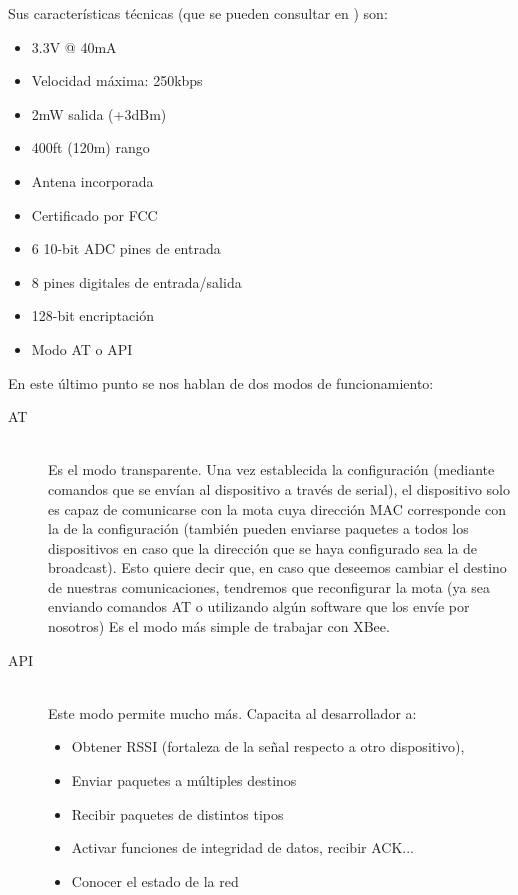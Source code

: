 Sus características técnicas (que se pueden consultar en \cite{xbeedatasheet}) son:
\begin{itemize}
  \item 3.3V @ 40mA
  \item Velocidad máxima: 250kbps
  \item 2mW salida (+3dBm)
  \item 400ft (120m) rango
  \item Antena incorporada
  \item Certificado por FCC
  \item 6 10-bit ADC pines de entrada
  \item 8 pines digitales de entrada/salida
  \item 128-bit encriptación
  \item Modo AT o API
\end{itemize}

En este último punto se nos hablan de dos modos de funcionamiento:

\begin{description}
  \item[AT] \hfill \\
    Es el modo transparente. Una vez establecida la configuración (mediante comandos
    que se envían al dispositivo a través de serial), el dispositivo solo es capaz de
    comunicarse con la mota cuya dirección MAC corresponde con la de la configuración
    (también pueden enviarse paquetes a todos los dispositivos en caso que la dirección
    que se haya configurado sea la de broadcast). Esto quiere decir que, en caso que
    deseemos cambiar el destino de nuestras comunicaciones, tendremos que reconfigurar
    la mota (ya sea enviando comandos AT o utilizando algún software que los envíe
    por nosotros) Es el modo más simple de trabajar con XBee.
 \item[API] \hfill \\
    Este modo permite mucho más. Capacita al desarrollador a:
      \begin{itemize}
        \item Obtener RSSI (fortaleza de la señal respecto a otro dispositivo),
        \item Enviar paquetes a múltiples destinos
        \item Recibir paquetes de distintos tipos
        \item Activar funciones de integridad de datos, recibir ACK...
        \item Conocer el estado de la red
      \end{itemize}
\end{description}



